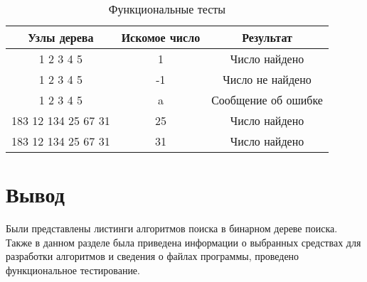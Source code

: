 \begin{table}[ht]
	\small
	\begin{center}
		\begin{threeparttable}
			\caption{Функциональные тесты}
			\label{tbl:func_tests}
			\begin{tabular}{|c|c|c|}
				\hline
				\bfseries Узлы дерева & \bfseries Искомое число & \bfseries Результат\\
				\hline
				1 2 3 4 5 & 1 & Число найдено\\
				\hline
				1 2 3 4 5 & -1 & Число не найдено \\
				\hline
				1 2 3 4 5 & a & Сообщение об ошибке\\
				\hline
				183 12 134 25 67 31 & 25 & Число найдено \\
				\hline
				183 12 134 25 67 31 & 31 & Число найдено \\
				\hline
			\end{tabular}
		\end{threeparttable}
	\end{center}
\end{table}


\section*{Вывод}

Были представлены листинги алгоритмов поиска в бинарном дереве поиска.
Также в данном разделе была приведена информации о выбранных средствах для разработки алгоритмов и сведения о файлах программы, проведено функциональное тестирование.